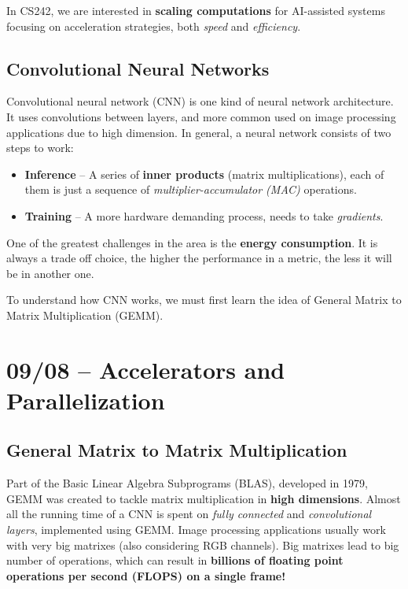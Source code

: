 \documentclass[abstract=true]{scrartcl}
\begin{document}
In CS242, we are interested in \textbf{scaling computations} for AI-assisted systems focusing on acceleration strategies, both \emph{speed} and \emph{efficiency}.

\subsection{Convolutional Neural Networks}

Convolutional neural network (CNN) \citep{lecun98} is one kind of neural network architecture. It uses convolutions between layers, and more common used on image processing applications due to high dimension.
In general, a neural network consists of two steps to work:

\begin{itemize}
    \item \textbf{Inference} -- A series of \textbf{inner products} (matrix multiplications), each of them is just a sequence of \emph{multiplier-accumulator (MAC)} operations.
    \item \textbf{Training} -- A more hardware demanding process, needs to take \emph{gradients}.
\end{itemize}

One of the greatest challenges in the area is the \textbf{energy consumption}. It is always a trade off choice, the higher the performance in a metric, the less it will be in another one.

To understand how CNN works, we must first learn the idea of General Matrix to Matrix Multiplication (GEMM).

\section{09/08 -- Accelerators and Parallelization}

\subsection{General Matrix to Matrix Multiplication}
Part of the Basic Linear Algebra Subprograms (BLAS), developed in 1979, GEMM was created to tackle matrix multiplication in \textbf{high dimensions}.
Almost all the running time of a CNN is spent on \emph{fully connected} and \emph{convolutional layers}, implemented using GEMM. Image processing applications usually work with very big matrixes (also considering RGB channels).
Big matrixes lead to big number of operations, which can result in \textbf{billions of floating point operations per second (FLOPS) on a single frame!}
\end{document}
